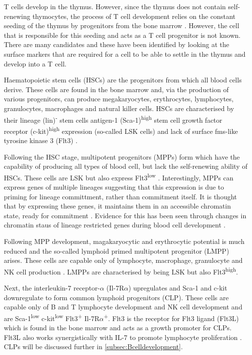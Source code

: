 T cells develop in the thymus.
However, since the thymus does not contain self-renewing thymocytes, the process of T cell development relies on the constant seeding of the thymus by progenitors from the bone marrow \citep{Zlotoff2011, Heinzel2007}.
However, the cell that is responsible for this seeding and acts as a T cell progenitor is not known.
There are many candidates and these have been identified by looking at the surface markers that are required for a cell to be able to settle in the thymus and develop into a T cell.

Haematopoietic stem cells (HSCs) are the progenitors from which all blood cells derive.
These cells are found in the bone marrow and, via the production of various progenitors, can produce megakaryocytes, erythrocytes, lymphocytes, granulocytes, macrophages and natural killer cells.
HSCs are characterised by their lineage (lin)\textsuperscript{-} stem cells antigen-1 (Sca-1)\textsuperscript{high} stem cell growth factor receptor (c-kit)\textsuperscript{high} expression (so-called LSK cells) and lack of surface fms-like tyrosine kinase 3 (Flt3) \citep{Welinder2011}.

Following the HSC stage, multipotent progenitors (MPPs) form which have the capability of producing all types of blood cell, but lack the self-renewing ability of HSCs.
These cells are LSK but also express Flt3\textsuperscript{low} \citep{Welinder2011}.
Interestingly, MPPs can express genes of multiple lineages \citep{Hu1997} suggesting that this expression is due to priming for lineage committment, rather than commitment itself.
It is thought that by expressing these genes, it maintains them in an accessible chromatin state, ready for commitment \citep{Welinder2011}.
Evidence for this has been seen through changes in chromatin staus of lineage restricted genes during blood cell development \citep{Weishaupt2010}.

Following MPP development, magakaryocytic and erythrocytic potential is much reduced and the so-called lymphoid primed multipotent progenitor (LMPP) arises.
These cells are capable only of lymphocyte, macrophage, granulocyte and NK cell production \citep{Adolfsson2005}.
LMPPs are characterised by being LSK but also Flt3\textsuperscript{high}.

Next, the interleukin-7 receptor-$\alpha$ (Il-7R$\alpha$) upregulates and Sca-1 and c-kit downregulate to form common lymphoid progenitors (CLP).
These cells are capable only of B and T lymphocyte development and NK cell development \citep{Kondo1997} and are Sca-1\textsuperscript{low} c-kit\textsuperscript{low} Flt3\textsuperscript{+} Il-7R$\alpha$\textsuperscript{+}.
Flt3 is the receptor for Flt3 ligand (Flt3L) which is found in the bone marrow and acts as a growth promoter for CLPs.
Flt3L also works synergistically with IL-7 to promote lymphocyte proliferation \citep{Holmes2006}.
CLPs will be discussed further in \cref{subsec:Bcelldevelopment}.



